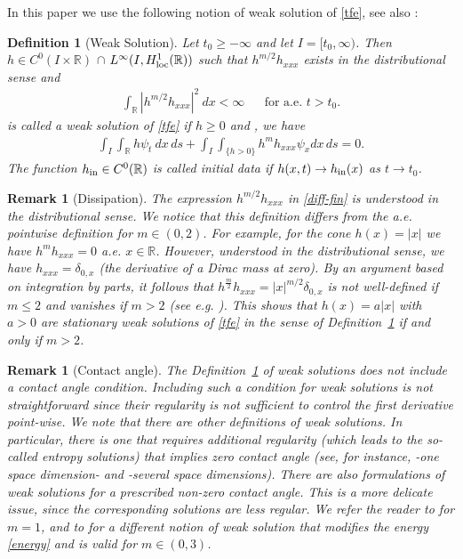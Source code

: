 \documentclass{article}%
\newtheorem{definition}[theorem]{Definition}
\newtheorem{remark}[theorem]{Remark}
\newcommand{\R}{\mathbb{R}}
\begin{document}
In this paper we use the following notion of weak solution of \eqref{tfe}, see also \cite{BerettaBertschDalpasso-1995,BernisFriedman-1990, BertozziPugh-1996}:
\begin{definition}[Weak Solution]\label{def-weak} 
  Let $t_0 \geq -\infty$ and let $I = [t_0,\infty)$. Then
  $h \in C^0(I \times \R)$ $\cap$ $L^\infty(I, H_{\rm loc}^1(\R))$ such that
  $h^{m/2} h_{xxx}$ exists in the distributional sense and
  \begin{align} \label{diff-fin} %
    \int_{\R} |h^{m/2} h_{xxx}|^2 \ dx < \infty &&\text{for a.e. $t > t_0.$}
  \end{align}
is called a weak solution of \eqref{tfe} if $h \geq 0$ and \text{for all $\psi \in C_c^\infty(I \times \R)$}, 
we have
  \begin{align}\label{weak}
    \int_I \int_{\R} h\psi_{t} \ dx \,ds + \int_{I} \int_{\{h>0\}} h^{m}h_{xxx}\psi _{x} dx\,ds=0.
  \end{align}
  The function $h_{\rm in} \in C^0(\R)$ is called initial data if $h(x,t) \to h_{\rm in}(x)$ as $t \to t_0$.  
\end{definition}
\begin{remark}[Dissipation] \label{rem-diss}%
  The expression $h^{m/2} h_{xxx}$ in \eqref{diff-fin} is understood in the
  distributional sense. We notice that this definition differs from the
  a.e. pointwise definition for $m \in (0,2)$. For example, for the cone
  $h(x) = |x|$ we have $h^m h_{xxx} = 0$ a.e. $x \in \R$. However, understood in
  the distributional sense, we have $h_{xxx}= \delta_{0,x}$ (the derivative of a Dirac mass at zero). By an argument based on integration by parts, it follows that $h^{\frac{m}{2}}h_{xxx} = |x|^{m/2} \delta_{0,x}$ is not well-defined if $m\leq 2$ and vanishes if $m> 2$ (see e.g. \cite{DuistermaatKolk2010}). 
This shows that $h(x)= a|x|$ with $a>0$ are stationary weak solutions of \eqref{tfe} in the sense of Definition~\ref{def-weak} if and only if $m>2$.
\end{remark}
\begin{remark}[Contact angle] %
 The Definition~\ref{def-weak} of weak solutions does not include a contact
  angle condition. Including such a condition for weak solutions is not
  straightforward since their regularity is not sufficient to control the 
first derivative point-wise. We note that there are other definitions of
  weak solutions. In particular, there is one that requires additional regularity 
(which leads to the so-called entropy solutions) that implies zero contact angle 
(see, for instance, \cite{BerettaBertschDalpasso-1995,BernisFriedman-1990,BertozziPugh-1996} -one
 space dimension- and \cite{BertschDalpassoGarckeGruen-1998, DalpassoGarckeGruen-1998} 
-several space dimensions). There are also formulations of weak solutions for a prescribed
 non-zero contact angle. This is a more delicate issue, since the corresponding solutions are less
  regular. We refer the reader to \cite{Otto-1998} for $m = 1$, and to 
\cite{BertschGiacomelliKarali-2005} for a different notion of weak solution that modifies the 
energy \eqref{energy} and is valid for $m \in (0,3)$.
\end{remark}
\end{document}
